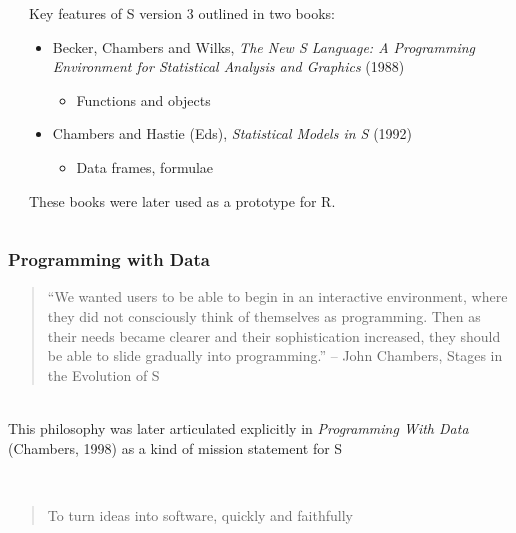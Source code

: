 \documentclass[svgnames, aspectratio=169]{beamer}
\begin{document}
\begin{frame}
\begin{columns}
\begin{column}{2cm}
    \end{column}
    \begin{column}{8cm}
      Key features of S version 3 outlined in two books:
      \begin{itemize}
        \item Becker, Chambers and Wilks, {\em The New S Language: A
          Programming Environment for Statistical Analysis and
          Graphics} (1988)
          \begin{itemize}
          \item Functions and objects
          \end{itemize}
        \item Chambers and Hastie (Eds), {\em Statistical Models in S} (1992)
          \begin{itemize}
          \item Data frames, formulae
          \end{itemize}
      \end{itemize}
      These books were later used as a prototype for R.
    \end{column}
  \end{columns}

\end{frame}

\begin{frame}
  \frametitle{Programming with Data}

  \begin{quote}
  ``We wanted users to be able to begin in an interactive environment,
  where they did not consciously think of themselves as programming. Then
  as their needs became clearer and their sophistication increased, they
  should be able to slide gradually into programming.''
  -- John Chambers, Stages in the Evolution of S
  \end{quote}

  ~\\
  
  This philosophy was later articulated explicitly in {\em Programming
    With Data} (Chambers, 1998) as a kind of mission statement for S

  ~\\
  
  \begin{quote}
    To turn ideas into software, quickly and faithfully
  \end{quote}
  
\end{frame}
\end{document}
